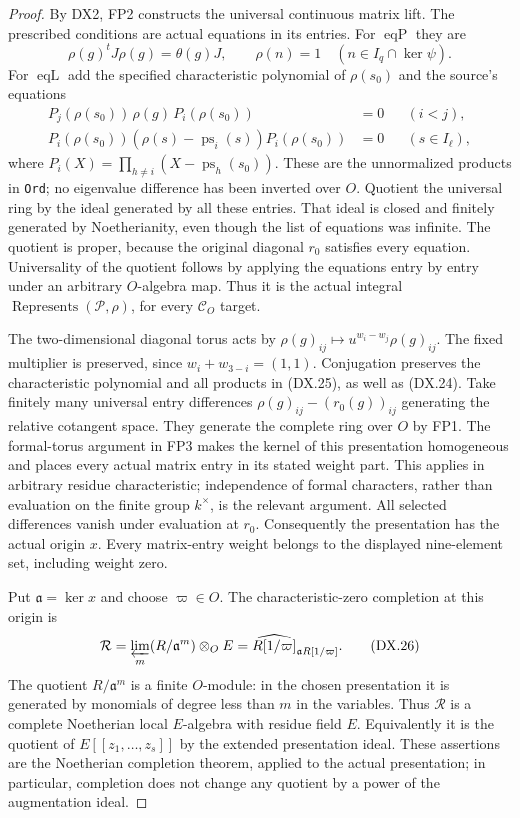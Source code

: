 \begin{proof}
By DX2, FP2 constructs the universal continuous matrix lift.
The prescribed conditions are actual equations in its entries.
For $\operatorname{eqP}$ they are
\[
 \rho(g)^tJ\rho(g)=\theta(g)J,\qquad
 \rho(n)=1\quad(n\in I_q\cap\ker\psi).
 \tag{DX.24}
\]
For $\operatorname{eqL}$ add the specified characteristic
polynomial of $\rho(s_0)$ and the source's equations
\[
 \begin{aligned}
 P_j(\rho(s_0))\,\rho(g)\,P_i(\rho(s_0))&=0
                                      &&(i<j),\\
 P_i(\rho(s_0))(\rho(s)-\operatorname{ps}_i(s))P_i(\rho(s_0))
                                      &=0 &&(s\in I_\ell),
 \end{aligned}
 \tag{DX.25}
\]
where
$P_i(X)=\prod_{h\ne i}(X-\operatorname{ps}_h(s_0))$.
These are the unnormalized products in \texttt{Ord};
no eigenvalue difference has been inverted over $O$.
Quotient the universal ring by the ideal generated by all these
entries.  That ideal is closed and finitely generated by
Noetherianity, even though the list of equations was infinite.
The quotient is proper, because the original diagonal $r_0$
satisfies every equation.  Universality of the quotient follows
by applying the equations entry by entry under an arbitrary
$O$-algebra map.  Thus it is the actual integral
$\operatorname{Represents}(\mathcal P,\rho)$, for every
$\mathcal C_O$ target.

The two-dimensional diagonal torus acts by
$\rho(g)_{ij}\mapsto u^{w_i-w_j}\rho(g)_{ij}$.
The fixed multiplier is preserved, since
$w_i+w_{3-i}=(1,1)$.
Conjugation preserves the characteristic polynomial and all
products in (DX.25), as well as (DX.24).
Take finitely many universal entry differences
$\rho(g)_{ij}-(r_0(g))_{ij}$ generating the relative
cotangent space.  They generate the complete ring over $O$
by FP1.  The formal-torus argument in FP3 makes the kernel
of this presentation homogeneous and places every actual
matrix entry in its stated weight part.  This applies in
arbitrary residue characteristic; independence of formal
characters, rather than evaluation on the finite group
$k^\times$, is the relevant argument.
All selected differences vanish under evaluation at $r_0$.
Consequently the presentation has the actual origin $x$.
Every matrix-entry weight belongs to the displayed nine-element
set, including weight zero.

Put $\mathfrak a=\ker x$ and choose $\varpi\in O$.
The characteristic-zero completion at this origin is
\[
 \mathcal R=\varprojlim_m(R/\mathfrak a^m)\otimes_OE
        =\widehat{R[1/\varpi]}_{\mathfrak a R[1/\varpi]}.
 \tag{DX.26}
\]
The quotient $R/\mathfrak a^m$ is a finite $O$-module:
in the chosen presentation it is generated by monomials of
degree less than $m$ in the variables.
Thus $\mathcal R$ is a complete Noetherian local
$E$-algebra with residue field $E$.
Equivalently it is the quotient of $E[[z_1,\ldots,z_s]]$
by the extended presentation ideal.
These assertions are the Noetherian completion theorem,
applied to the actual presentation; in particular, completion
does not change any quotient by a power of the augmentation
ideal.


\end{proof}
